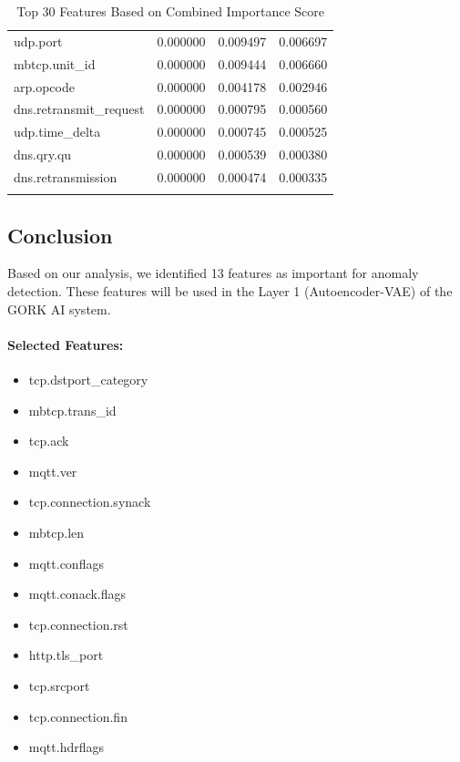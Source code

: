 \documentclass{article}
\begin{document}
\begin{longtable}{lrrr}
udp.port & 0.000000 & 0.009497 & 0.006697 \\
mbtcp.unit_id & 0.000000 & 0.009444 & 0.006660 \\
arp.opcode & 0.000000 & 0.004178 & 0.002946 \\
dns.retransmit_request & 0.000000 & 0.000795 & 0.000560 \\
udp.time_delta & 0.000000 & 0.000745 & 0.000525 \\
dns.qry.qu & 0.000000 & 0.000539 & 0.000380 \\
dns.retransmission & 0.000000 & 0.000474 & 0.000335 \\
\bottomrule
\caption{Top 30 Features Based on Combined Importance Score}
\end{longtable}
\subsection{Conclusion}
Based on our analysis, we identified 13 features as important for anomaly detection. These features will be used in the Layer 1 (Autoencoder-VAE) of the GORK AI system.
\paragraph{Selected Features:}
\begin{itemize}
\item tcp.dstport_category
\item mbtcp.trans_id
\item tcp.ack
\item mqtt.ver
\item tcp.connection.synack
\item mbtcp.len
\item mqtt.conflags
\item mqtt.conack.flags
\item tcp.connection.rst
\item http.tls_port
\item tcp.srcport
\item tcp.connection.fin
\item mqtt.hdrflags
\end{itemize}
\end{document}
